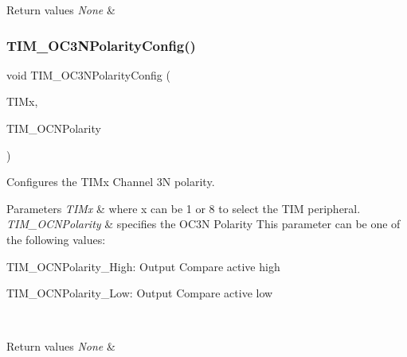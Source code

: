 \begin{DoxyRetVals}{Return values}
{\em None} & \\
\hline
\end{DoxyRetVals}
\mbox{\label{group___t_i_m___exported___functions_gac710acc5b682e892584fc6f089f61dc2}} 
\subsubsection{\texorpdfstring{TIM\_OC3NPolarityConfig()}{TIM\_OC3NPolarityConfig()}}
{\footnotesize\ttfamily void T\+I\+M\+\_\+\+O\+C3\+N\+Polarity\+Config (\begin{DoxyParamCaption}\item[{\mbox{\hyperlink{struct_t_i_m___type_def}{T\+I\+M\+\_\+\+Type\+Def}} $\ast$}]{T\+I\+Mx,  }\item[{uint16\+\_\+t}]{T\+I\+M\+\_\+\+O\+C\+N\+Polarity }\end{DoxyParamCaption})}



Configures the T\+I\+Mx Channel 3N polarity. 


\begin{DoxyParams}{Parameters}
{\em T\+I\+Mx} & where x can be 1 or 8 to select the T\+IM peripheral. \\
\hline
{\em T\+I\+M\+\_\+\+O\+C\+N\+Polarity} & specifies the O\+C3N Polarity This parameter can be one of the following values\+: \begin{DoxyItemize}
\item T\+I\+M\+\_\+\+O\+C\+N\+Polarity\+\_\+\+High\+: Output Compare active high \item T\+I\+M\+\_\+\+O\+C\+N\+Polarity\+\_\+\+Low\+: Output Compare active low \end{DoxyItemize}
\\
\hline
\end{DoxyParams}

\begin{DoxyRetVals}{Return values}
{\em None} & \\
\hline
\end{DoxyRetVals}
\mbox{\label{group___t_i_m___exported___functions_ga1ef43b03fe666495e80aac9741ae7ab0}} 
